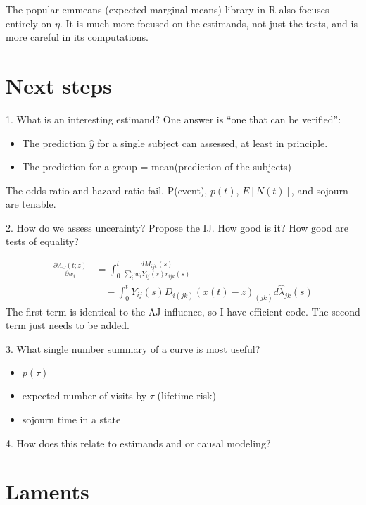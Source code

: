 \documentclass{article}\usepackage[]{graphicx}\usepackage[]{xcolor}
\newcommand{\xbar}{\overline x}
\newcommand{\lhat}{\hat\lambda}
\begin{document}
The popular emmeans (expected marginal means) library in R also focuses 
entirely on $\eta$.  It is much more focused on the estimands, not just
the tests, and is more careful in its computations.

\section{Next steps}

1. What is an interesting estimand? One answer is ``one that can be verified'':
\begin{itemize}
  \item The prediction $\hat y$ for a single subject can assessed, at 
    least in principle.
  \item The prediction for a group = mean(prediction of the subjects)
\end{itemize}
 
The odds ratio and hazard ratio fail.  P(event), $p(t)$, $E[N(t)]$, and
sojourn are tenable.  

2. How do we assess uncerainty?  Propose the IJ. How good is it?  How good
are tests of equality?

\begin{align*}
  \frac{\partial \Lambda_C(t;z)}{\partial w_i} &=
    \int_0^t \frac{dM_{ijk}(s)}{\sum_i w_i Y_{ij}(s) r_{ijk}(s)}  \\
       & \quad - \int_0^t Y_{ij}(s) D_{i(jk)} (\xbar(t)-z)_{(jk)} d\lhat_{jk}(s)
\end{align*}
The first term is identical to the AJ influence, so I have efficient code.
The second term just needs to be added.

3. What single number summary of a curve is most useful?
\begin{itemize}
  \item $p(\tau)$
  \item expected number of visits by $\tau$ (lifetime risk)
  \item sojourn time in a state
\end{itemize}

4. How does this relate to estimands and or causal modeling?



\section{Laments}
\end{document}
